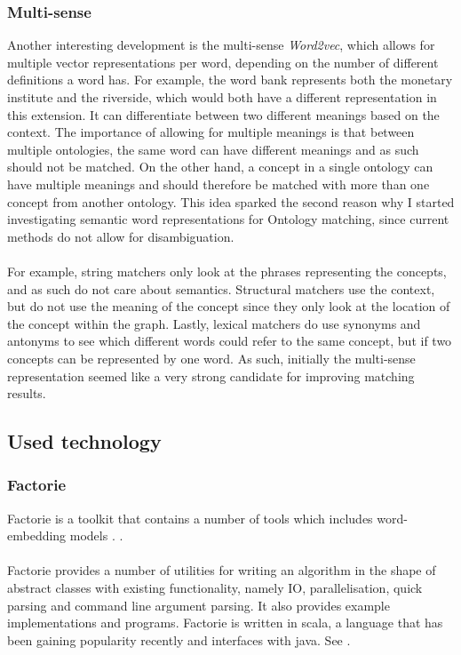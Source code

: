 \documentclass{article}
\begin{document}
 \subsubsection{Multi-sense} \label{multisense}
 Another interesting development is the multi-sense \emph{Word2vec}, which allows for multiple vector representations per word, depending on the number of different definitions a word has. For example, the word bank represents both the monetary institute and the riverside, which would both have a different representation in this extension. It can differentiate between two different meanings based on the context. The importance of allowing for multiple meanings is that between multiple ontologies, the same word can have different meanings and as such should not be matched. On the other hand, a concept in a single ontology can have multiple meanings and should therefore be matched with more than one concept from another ontology\cite{multisense}. This idea sparked the second reason why I started investigating semantic word representations for Ontology matching, since current methods do not allow for disambiguation.
 \paragraph{}
 For example, string matchers only look at the phrases representing the concepts, and as such do not care about semantics. Structural matchers use the context, but do not use the meaning of the concept since they only look at the location of the concept within the graph. Lastly, lexical matchers do use synonyms and antonyms to see which different words could refer to the same concept, but if two concepts can be represented by one word. As such, initially the multi-sense representation seemed like a very strong candidate for improving matching results.
 
 \subsection{Used technology}
 \subsubsection{Factorie} \label{factorie}
 Factorie is a toolkit that contains a number of tools which includes word-embedding models \cite{git-factorie}. \cite{w2v}.
 \paragraph{}
 Factorie provides a number of utilities for writing an algorithm in the shape of abstract classes with existing functionality, namely IO, parallelisation, quick parsing and command line argument parsing. It also provides example implementations and programs. Factorie is written in scala, a language that has been gaining popularity recently and interfaces with java. See \cite{scala}. 
\end{document}
